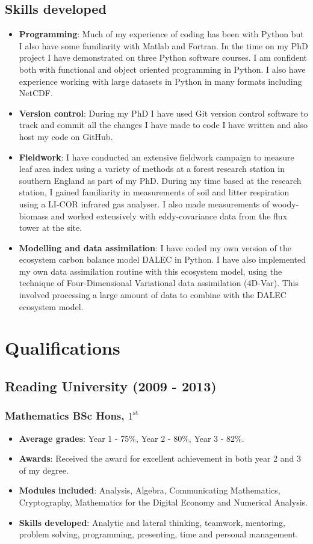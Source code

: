 \documentclass[11pt]{article}
\begin{document}
\subsection*{Skills developed}
\begin{itemize}
\item \textbf{Programming}: Much of my experience of coding has been with Python but I also have some familiarity with Matlab and Fortran. In the time on my PhD project I have demonstrated on three Python software courses. I am confident both with functional and object oriented programming in Python. I also have experience working with large datasets in Python in many formats including NetCDF. 
\item \textbf{Version control}: During my PhD I have used Git version control software to track and commit all the changes I have made to code I have written and also host my code on GitHub. 
\item \textbf{Fieldwork}: I have conducted an extensive fieldwork campaign to measure leaf area index using a variety of methods at a forest research station in southern England as part of my PhD. During my time based at the research station, I gained familiarity in measurements of soil and litter respiration using a LI-COR infrared gas analyser. I also made measurements of woody-biomass and worked extensively with eddy-covariance data from the flux tower at the site. 
\item \textbf{Modelling and data assimilation}: I have coded my own version of the ecosystem carbon balance model DALEC in Python. I have also implemented my own data assimilation routine with this ecosystem model, using the technique of Four-Dimensional Variational data assimilation (4D-Var). This involved processing a large amount of data to combine with the DALEC ecosystem model.
\end{itemize}

\section*{Qualifications}
\subsection*{Reading University (2009 - 2013)}
\subsubsection*{Mathematics BSc Hons, \(1^{\text{st}}\)}
\begin{itemize}
\item \textbf{Average grades}: Year 1 - 75\%, Year 2 - 80\%, Year 3 - 82\%.
\item \textbf{Awards}: Received the award for excellent achievement in both year 2 and 3 of my degree.
\item \textbf{Modules included}: Analysis, Algebra, Communicating Mathematics, Cryptography, Mathematics for the Digital Economy and Numerical Analysis.
\item \textbf{Skills developed}: Analytic and lateral thinking, teamwork, mentoring, problem solving, programming, presenting, time and personal management.
\end{itemize}
\end{document}
